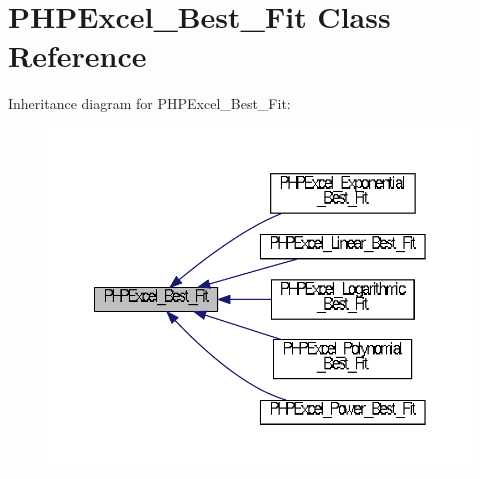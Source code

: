 \section{P\+H\+P\+Excel\+\_\+\+Best\+\_\+\+Fit Class Reference}
\label{class_p_h_p_excel___best___fit}


Inheritance diagram for P\+H\+P\+Excel\+\_\+\+Best\+\_\+\+Fit\+:\nopagebreak
\begin{figure}[H]
\begin{center}
\leavevmode
\includegraphics[width=350pt]{class_p_h_p_excel___best___fit__inherit__graph}
\end{center}
\end{figure}
